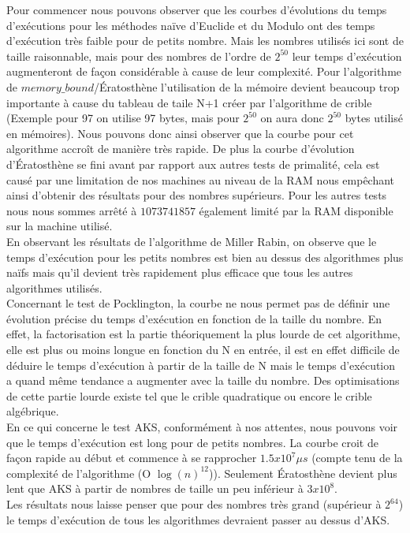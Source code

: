 	Pour commencer nous pouvons observer que les courbes d'évolutions du temps d'exécutions pour les méthodes naïve d'Euclide et du Modulo ont des temps d'exécution très faible pour de petits nombre. Mais les nombres utilisés ici sont de taille raisonnable, mais pour des nombres de l'ordre de $2^{50}$ leur temps d'exécution augmenteront de façon considérable à cause de leur complexité. Pour l'algorithme de $memory\_bound$/Ératosthène l'utilisation de la mémoire devient beaucoup trop importante à cause du tableau de taile N+1 créer par l'algorithme de crible (Exemple pour 97 on utilise 97 bytes, mais pour $2^{50}$ on aura donc $2^{50}$ bytes utilisé en mémoires). Nous pouvons donc ainsi observer que la courbe pour cet algorithme accroît de manière très rapide. De plus la courbe d'évolution d’Ératosthène se fini avant par rapport aux autres tests de primalité, cela est causé par une limitation de nos machines au niveau de la RAM nous empêchant ainsi d'obtenir des résultats pour des nombres supérieurs. Pour les autres tests nous nous sommes arrêté à $1073741857$ également limité par la RAM disponible sur la machine utilisé.\\	
	
	En observant les résultats de l’algorithme de Miller Rabin, on observe que le temps d’exécution pour les petits nombres est bien au dessus des algorithmes plus naïfs mais qu’il devient très rapidement plus efficace que tous les autres algorithmes utilisés. \\		
		
		Concernant le test de Pocklington, la courbe ne nous permet pas de définir une évolution précise du temps d'exécution en fonction de la taille du nombre. En effet, la factorisation est la partie théoriquement la plus lourde de cet algorithme, elle est plus ou moins longue en fonction du N en entrée, il est en effet difficile de déduire le temps d’exécution à partir de la taille de N mais le temps d'exécution a quand même tendance a augmenter avec la taille du nombre. Des optimisations de cette partie lourde existe tel que le crible quadratique ou encore le crible algébrique.\\		
		En ce qui concerne le test AKS, conformément à nos attentes, nous pouvons voir que le temps d’exécution est long pour de petits nombres. La courbe croit de façon rapide au début et commence à se rapprocher $1.5x10^7 \mu s$ (compte tenu de la complexité de l’algorithme (O $\log(n)^{12}$)). Seulement Ératosthène devient plus lent que AKS à partir de nombres de taille un peu inférieur à $3x10^8$. \\
Les résultats nous laisse penser que pour des nombres très grand (supérieur à $2^{64}$) le temps d'exécution de tous les algorithmes devraient passer au dessus d’AKS.\\

